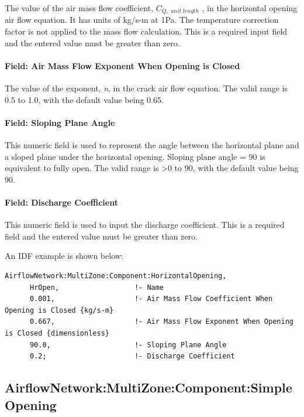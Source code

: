 The value of the air mass flow coefficient, \({C_{Q,\;unit\;length}}\) , in the horizontal opening air flow equation. It has units of kg/s-m at 1Pa. The temperature correction factor is not applied to the mass flow calculation. This is a required input field and the entered value must be greater than zero.

\paragraph{Field: Air Mass Flow Exponent When Opening is Closed}\label{field-air-mass-flow-exponent-when-opening-is-closed-1}

The value of the exponent, \emph{n}, in the crack air flow equation. The valid range is 0.5 to 1.0, with the default value being 0.65.

\paragraph{Field: Sloping Plane Angle}\label{field-sloping-plane-angle}

This numeric field is used to represent the angle between the horizontal plane and a sloped plane under the horizontal opening. Sloping plane angle = 90 is equivalent to fully open. The valid range is \textgreater{}0 to 90, with the default value being 90.

\paragraph{Field: Discharge Coefficient}\label{field-discharge-coefficient-1}

This numeric field is used to input the discharge coefficient. This is a required field and the entered value must be greater than zero.

An IDF example is shown below:

\begin{lstlisting}
AirflowNetwork:MultiZone:Component:HorizontalOpening,
      HrOpen,                  !- Name
      0.001,                   !- Air Mass Flow Coefficient When Opening is Closed {kg/s-m}
      0.667,                   !- Air Mass Flow Exponent When Opening is Closed {dimensionless}
      90.0,                    !- Sloping Plane Angle
      0.2;                     !- Discharge Coefficient
\end{lstlisting}

\subsection{AirflowNetwork:MultiZone:Component:SimpleOpening}\label{airflownetworkmultizonecomponentsimpleopening}

